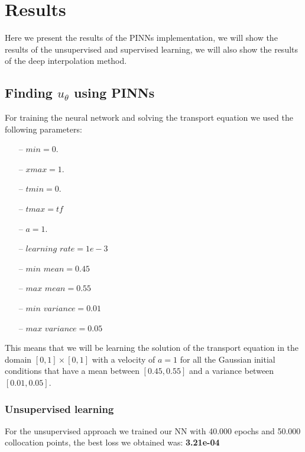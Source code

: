 \documentclass{article}
\begin{document}
\section{Results}

Here we present the results of the PINNs implementation, we will show the results of the unsupervised and supervised learning, we will also show the results of the deep interpolation method.

\subsection{Finding $u_\theta$ using PINNs}

For training the neural network and solving the transport equation we used the following parameters:

\begin{itemize}
    \item[--] $min = 0.$
    \item[--] $xmax = 1.$
    \item[--] $tmin = 0.$
    \item[--] $tmax = tf$
    \item[--] $a = 1.$
    \item[--] $learning$ $rate = 1e-3$
    \item[--] $min$ $mean = 0.45$
    \item[--] $max$ $mean = 0.55$
    \item[--] $min$ $variance = 0.01$
    \item[--] $max$ $variance = 0.05$
\end{itemize}

This means that we will be learning the solution of the transport equation in the domain $[0,1] \times [0,1]$ with a velocity of $a=1$ for all the Gaussian initial conditions that have a mean between $[0.45,0.55]$ and a variance between $[0.01,0.05]$.

\subsubsection{Unsupervised learning}

For the unsupervised approach we trained our NN with 40.000 epochs and 50.000 collocation points, the best loss we obtained was: \textbf{3.21e-04} \\
\end{document}
